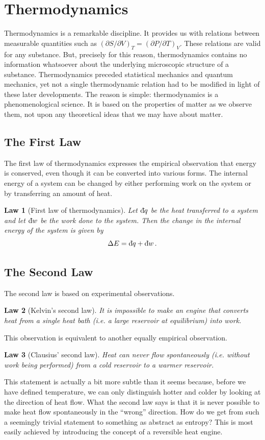 \documentclass{article}
\theoremstyle{plain}\theoremheaderfont{\normalfont\bfseries}\theorembodyfont{\rmfamily}\theoremseparator{.}\newtheorem*{thm}{Theorem}\newtheorem*{law}{Law}\newtheorem*{pos}{Postulate}
\numberwithin{equation}{section}
\newcommand{\dbar}{\mathrm{d}\hspace*{-0.14em}\bar{}\hspace*{0.12em}}
\begin{document}
    \section{Thermodynamics}\label{Chap:Thermodynamics}

    Thermodynamics is a remarkable discipline. It provides us with relations between measurable quantities such as \((\partial S/\partial V)_T=(\partial P/\partial T)_V\). These relations are valid for any substance. But, precisely for this reason, thermodynamics contains no information whatsoever about the underlying microscopic structure of a substance. Thermodynamics preceded statistical mechanics and quantum mechanics, yet not a single thermodynamic relation had to be modified in light of these later developments. The reason is simple: thermodynamics is a phenomenological science. It is based on the properties of matter as we observe them, not upon any theoretical ideas that we may have about matter.
    \subsection{The First Law}
    The first law of thermodynamics expresses the empirical observation that energy is conserved, even though it can be converted into various forms. The internal energy of a system can be changed by either performing work on the system or by transferring an amount of heat.
    \begin{law}[First law of thermodynamics]
        Let \(\dbar q\) be the heat transferred to a system and let \(\dbar w\) be the work done to the system. Then the change in the internal energy of the system is given by
        \begin{equation}
            \Delta E=\dbar q+\dbar w\,.
        \end{equation}
    \end{law}
    \subsection{The Second Law}
    The second law is based on experimental observations.
    \begin{law}[Kelvin's second law]
        It is impossible to make an engine that converts heat from a single heat bath (i.e. a large reservoir at equilibrium) into work.
    \end{law}
    This observation is equivalent to another equally empirical observation.
    \begin{law}[Clausius' second law]
        Heat can never flow spontaneously (i.e. without work being performed) from a cold reservoir to a warmer reservoir.
    \end{law}
    This statement is actually a bit more subtle than it seems because, before we have defined temperature, we can only distinguish hotter and colder by looking at the direction of heat flow. What the second law says is that it is never possible to make heat flow spontaneously in the ``wrong'' direction. How do we get from such a seemingly trivial statement to something as abstract as entropy? This is most easily achieved by introducing the concept of a reversible heat engine.
\end{document}

